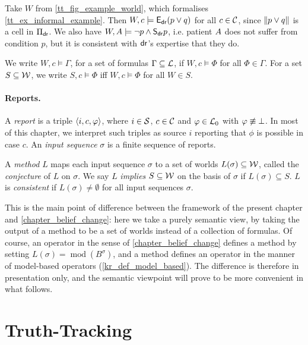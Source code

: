 \begin{example}
    \label{tt_ex_semantics}
    Take $W$ from \cref{tt_fig_example_world}, which formalises
    \cref{tt_ex_informal_example}. Then $W, c \models \mathsf{E}_{\mathsf{dr}{}}(p \lor q)$ for
    all $c \in \mathcal{C}$, since $\|{p \lor q}\|$ is a cell in $\Pi_{\mathsf{dr}{}}$.
    We also have $W, A{} \models \neg{p} \land \mathsf{S}_{\mathsf{dr}{}}p$, i.e.
    patient $A{}$ does not suffer from condition $p$, but it is
    consistent with $\mathsf{dr}{}$'s expertise that they do.
\end{example}

We write $W, c \models \Gamma$, for a set of formulas $\Gamma \subseteq \mathcal{L}$, if
$W, c \models \Phi$ for all $\Phi \in \Gamma$. For a set $S \subseteq \mathcal{W}$,
we write $S, c \models \Phi$ iff $W, c \models \Phi$ for all $W \in S$.

\paragraph{Reports.}

A \emph{report} is a triple $\langle {i, c, \varphi} \rangle$, where $i \in \mathcal{S}$, $c \in
\mathcal{C}$ and $\varphi \in \mathcal{L}_0$ with $\varphi \not\equiv \bot$. In most of this chapter, we
interpret such triples as source $i$ reporting that $\phi$ is possible in case
$c$. An \emph{input sequence} $\sigma$ is a finite sequence of reports.

A \emph{method} $L$ maps each input sequence $\sigma$ to a set of worlds
$L(\sigma) \subseteq \mathcal{W}$, called the \emph{conjecture} of $L$ on $\sigma$.
We say $L$ \emph{implies} $S \subseteq \mathcal{W}$ on the basis of $\sigma$ if
$L(\sigma) \subseteq S$. $L$ is \emph{consistent} if $L(\sigma) \ne \emptyset$
for all input sequences $\sigma$.

This is the main point of difference between the framework of the present
chapter and \cref{chapter_belief_change}: here we take a purely semantic view,
by taking the output of a method to be a set of worlds instead of a collection
of formulas. Of course, an operator in the sense of
\cref{chapter_belief_change} defines a method by setting $L(\sigma) =
\operatorname{mod}(B^\sigma)$, and a method defines an operator in the manner
of model-based operators (\cref{kr_def_model_based}). The difference is
therefore in presentation only, and the semantic viewpoint will prove to be
more convenient in what follows.

\section{Truth-Tracking}
\label{tt_sec_truthtracking}

